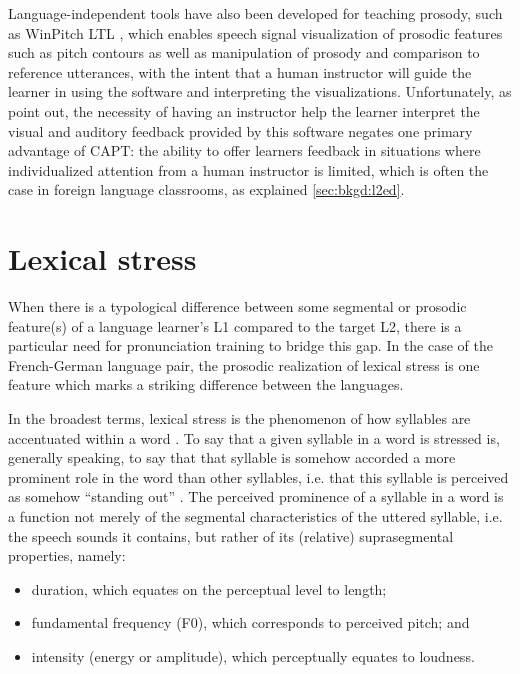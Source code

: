 	Language-independent tools have also been developed for teaching prosody, such as WinPitch LTL \citep{Martin2004}, which enables speech signal visualization of prosodic features such as pitch contours as well as manipulation of prosody and comparison to reference utterances, with the intent that a human instructor will guide the learner in using the software and interpreting the visualizations. Unfortunately, as \textcite{Neri2002} point out, the necessity of having an instructor help the learner interpret the visual and auditory feedback provided by this software negates one primary advantage of CAPT:
	the ability to offer learners feedback in situations where individualized attention from a human instructor is limited, which is often the case in foreign language classrooms, as explained \cref{sec:bkgd:l2ed}.
	
	
	
	
 \section{Lexical stress}
 \label{sec:bkgd:stress}
		When there is a typological difference between some segmental or prosodic feature(s) of a language learner's L1 compared to the target L2, there is a particular need for pronunciation training to bridge this gap. In the case of the French-German language pair, the prosodic realization of lexical stress is one feature which marks a striking difference between the languages.
		
			In the broadest terms, lexical stress is the phenomenon of how syllables are accentuated within a word  \citep{Cutler2005}. To say that a given syllable in a word is stressed is, generally speaking, to say that that syllable is somehow accorded a more prominent role in the word than other syllables, i.e. that this syllable is perceived as somehow ``standing out'' \citep{Dogil1999}.
			The perceived prominence of a syllable in a word is a function not merely of the segmental characteristics of the uttered syllable, i.e. the speech sounds it contains, but rather of its (relative) suprasegmental properties, namely: %
			\begin{itemize}
			\item duration, which equates on the perceptual level to length; %
			\item fundamental frequency (F0), which corresponds to perceived pitch; and
			\item intensity (energy or amplitude), which perceptually equates to loudness.
			\end{itemize}

